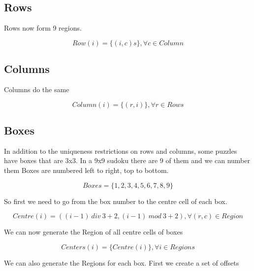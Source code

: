 \documentclass{article}
\begin{document}
\subsection{Rows}

Rows now form 9 regions.

\begin{equation}
Row(i) = \lbrace  (i, c) s \rbrace , \forall c \in Column
\end{equation}


\subsection{Columns}

Columns do the same

\begin{equation}
Column(i) = \lbrace  (r, i)  \rbrace , \forall r \in Rows
\end{equation}


\subsection{Boxes}

In addition to the uniqueness restrictions on rows and columns, some puzzles have boxes that are 3x3. In a 9x9 sudoku there are 9 of them and we can number them
Boxes are numbered left to right, top to bottom. 

\begin{equation}
Boxes=\lbrace1,2,3,4,5,6,7,8,9 \rbrace
\end{equation}


So first we need to go from the box number to the centre cell of each box. 

\begin{equation}
Centre(i) =  ( (i-1)\: div\:3 + 2, (i-1)\: mod\:3 + 2) ,  \forall (r,c) \in Region
\end{equation}

We can now generate the Region of all centre cells of boxes

\begin{equation}
Centers(i) = \lbrace Centre(i)  \rbrace , \forall i \in Regions
\end{equation}

We can also generate the Regions for each box. First we create a set of offsets
\end{document}
